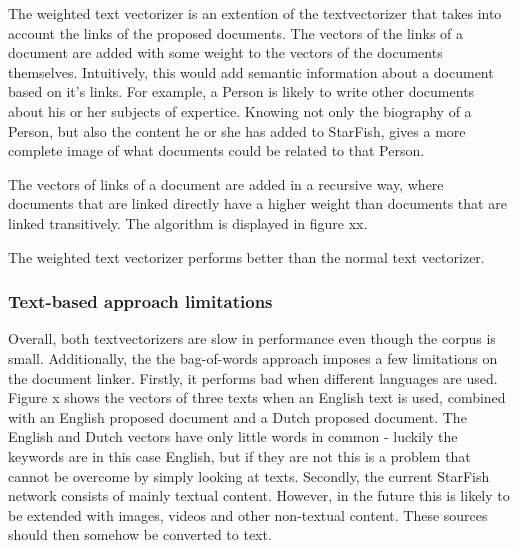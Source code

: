 The weighted text vectorizer is an extention of the textvectorizer that takes into account the links of the proposed documents. The vectors of the links of a document are added with some weight to the vectors of the documents themselves. Intuitively, this would add semantic information about a document based on it's links. For example, a Person is likely to write other documents about his or her subjects of expertice. Knowing not only the biography of a Person, but also the content he or she has added to StarFish, gives a more complete image of what documents could be related to that Person.

The vectors of links of a document are added in a recursive way, where documents that are linked directly have a higher weight than documents that are linked transitively. The algorithm is displayed in figure xx.

The weighted text vectorizer performs better than the normal text vectorizer. %

\subsubsection{Text-based approach limitations}
Overall, both textvectorizers are slow in performance even though the corpus is small. Additionally, the the bag-of-words approach imposes a few limitations on the document linker. Firstly, it performs bad when different languages are used. Figure x shows the vectors of three texts when an English text is used, combined with an English proposed document and a Dutch proposed document. The English and Dutch vectors have only little words in common - luckily the keywords are in this case English, but if they are not this is a problem that cannot be overcome by simply looking at texts. Secondly, the current StarFish network consists of mainly textual content. However, in the future this is likely to be extended with images, videos and other non-textual content. These sources should then somehow be converted to text.